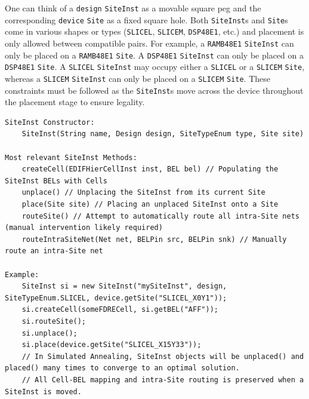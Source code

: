 \begin{multicols}{2}
One can think of a \texttt{design} \texttt{SiteInst} as a movable square peg and the corresponding \texttt{device} \texttt{Site} as a fixed square hole. 
Both \texttt{SiteInst}s and \texttt{Site}s come in various shapes or types (\texttt{SLICEL}, \texttt{SLICEM}, \texttt{DSP48E1}, etc.) and placement is only allowed between compatible pairs. 
For example, a \texttt{RAMB48E1} \texttt{SiteInst} can only be placed on a \texttt{RAMB48E1} \texttt{Site}.
A \texttt{DSP48E1} \texttt{SiteInst} can only be placed on a \texttt{DSP48E1} \texttt{Site}.
A \texttt{SLICEL} \texttt{SiteInst} may occupy either a \texttt{SLICEL} or a \texttt{SLICEM} \texttt{Site}, whereas a \texttt{SLICEM} \texttt{SiteInst} can only be placed on a \texttt{SLICEM} \texttt{Site}.
These constraints must be followed as the \texttt{SiteInst}s move across the device throughout the placement stage to ensure legality. 


\end{multicols}
\begin{lstlisting}[caption=\texttt{SiteInst} constructor and methods.]
SiteInst Constructor: 
    SiteInst(String name, Design design, SiteTypeEnum type, Site site)

Most relevant SiteInst Methods:
    createCell(EDIFHierCellInst inst, BEL bel) // Populating the SiteInst BELs with Cells
    unplace() // Unplacing the SiteInst from its current Site
    place(Site site) // Placing an unplaced SiteInst onto a Site
    routeSite() // Attempt to automatically route all intra-Site nets (manual intervention likely required)
    routeIntraSiteNet(Net net, BELPin src, BELPin snk) // Manually route an intra-Site net

Example:
    SiteInst si = new SiteInst("mySiteInst", design, SiteTypeEnum.SLICEL, device.getSite("SLICEL_X0Y1"));
    si.createCell(someFDRECell, si.getBEL("AFF"));
    si.routeSite();
    si.unplace();
    si.place(device.getSite("SLICEL_X15Y33"));
    // In Simulated Annealing, SiteInst objects will be unplaced() and placed() many times to converge to an optimal solution. 
    // All Cell-BEL mapping and intra-Site routing is preserved when a SiteInst is moved. 

\end{lstlisting}


